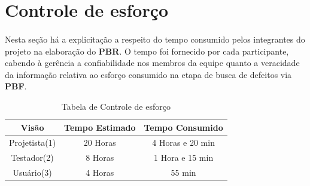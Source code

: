 \documentclass[12pt,a4paper]{article}
\begin{document}
	\section{Controle de esforço}
	\paragraph{} Nesta seção há a explicitação a respeito do tempo consumido pelos integrantes do projeto na elaboração do \textbf{PBR}. O tempo foi fornecido por cada participante, cabendo à gerência a confiabilidade nos membros da equipe quanto a veracidade da informação relativa ao esforço consumido na etapa de busca de defeitos via \textbf{PBF}.
	\vspace{0.45cm}
		\begin{table}[ht]
		 \centering
	\begin{tabular}{||c|c|c||}\hline
		\textbf{Visão} & \textbf{Tempo Estimado} & \textbf{Tempo Consumido} \\ \hline
		Projetista(1) & 20 Horas & 4 Horas e 20 min \\ \hline
		Testador(2) & 8 Horas & 1 Hora e 15 min \\ \hline
		Usuário(3) & 4 Horas & 55 min \\ \hline
	\end{tabular} 
	\caption{Tabela de Controle de esforço}
	\end{table}
		
	
\end{document}
